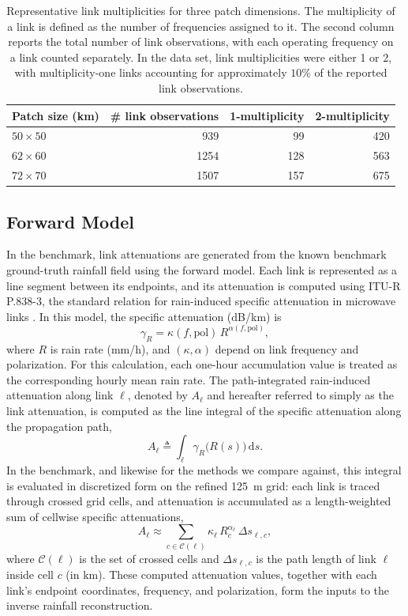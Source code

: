 \documentclass[11pt]{article}
\begin{document}
\begin{table}[!htbp]
  \centering
  \begin{tabular}{lrrr}
    \toprule
    Patch size (km) & \# link observations & 1-multiplicity & 2-multiplicity \\
    \midrule
    $50 \times 50$ & 939 & 99 & 420 \\
    $62 \times 60$ & 1254 & 128 & 563  \\
    $72 \times 70$ & 1507 & 157 & 675  \\
    \bottomrule
  \end{tabular}
  \caption{Representative link multiplicities for three patch dimensions.
The multiplicity of a link is defined as the number of frequencies assigned to it.
The second column reports the total number of link observations, with each operating frequency on a link counted separately.
In the data set, link multiplicities were either 1 or 2, with multiplicity-one links accounting for approximately $10\%$ of the reported link observations.
}
  \label{tab:link_multiplicity}

\end{table}


\subsection{Forward Model}
In the benchmark, link attenuations are generated from the known benchmark ground-truth rainfall field using the forward model. Each link is represented as a line segment between its endpoints, and its attenuation is computed using ITU-R P.838-3, the standard relation for rain-induced specific attenuation in microwave links \citep{itu2005p838}. In this model, the specific attenuation (dB/km) is
\[
\gamma_R = \kappa(f,\mathrm{pol})\,R^{\alpha(f,\mathrm{pol})},
\]
where $R$ is rain rate (mm/h), and $(\kappa,\alpha)$ depend on link frequency and polarization. For this calculation, each one-hour accumulation value is treated as the corresponding hourly mean rain rate. The path-integrated rain-induced attenuation along link $\ell$, denoted by $A_\ell$ and hereafter referred to simply as the link attenuation, is computed as the line integral of the specific attenuation along the propagation path,
\[
A_\ell \triangleq \int_{\ell} \gamma_R\bigl(R(s)\bigr)\,\mathrm{d}s.
\]
In the benchmark, and likewise for the methods we compare against, this integral is evaluated in discretized form on the refined \SI{125}{m} grid: each link is traced through crossed grid cells, and attenuation is accumulated as a length-weighted sum of cellwise specific attenuations,
\[
A_\ell \approx \sum_{c\in\mathcal{C}(\ell)} \kappa_\ell\,R_c^{\alpha_\ell}\,\Delta s_{\ell,c},
\]
where $\mathcal{C}(\ell)$ is the set of crossed cells and $\Delta s_{\ell,c}$ is the path length of link $\ell$ inside cell $c$ (in km). These computed attenuation values, together with each link's endpoint coordinates, frequency, and polarization, form the inputs to the inverse rainfall reconstruction.
\end{document}

